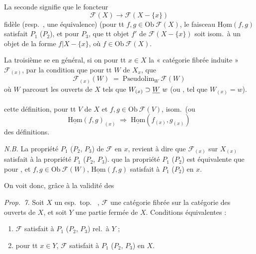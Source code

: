 \documentclass[11pt,a4paper]{article}
\begin{document}

La seconde \ill{} signifie que le foncteur
\[
  \mathcal{F}(X) \longrightarrow \mathcal{F}(X - \{x\})
\]
\ill{} fidèle \struck{\ill{}} (resp.\ , une équivalence)
\ill{}  (pour tt $f, g \in \mathrm{Ob}\ \mathcal{F}(X)$,
le faisceau $\underline{\mathrm{Hom}}(f,g)$ satisfait $P_1$ ($P_2$), et pour
$P_3$, que tt objet $f'$ de $\mathcal{F}(X - \{x\})$ soit isom.\ à un objet de
la forme $f | X - \{x\}$, où $f \in \mathrm{Ob}\ \mathcal{F}(X)$.


La troisième \ill{} se  \ill{} en général, si on
 pour tt $x \in X$ la « catégorie fibrée induite »
$\mathcal{F}_{(x)}$, par la condition que pour tt \struck{\ill{}} $W$ de
$X_{x}$, \ill{} que
\[
  \mathcal{F}_{(x)}(W) \;=\; \mathrm{Pseudolim}_{W}\ \mathcal{F}(W)
\]
où $W$ parcourt les ouverts de $X$ tels que $W_{(x)} \supset \struck{W}\ w$
(ou \ill{} , tel que $W_{(x)} = w$).
\struck{\ill{}}

\ill{} cette définition, pour tt \ill{} $V$ de $X$ et \ill{}
$f, g \in \mathrm{Ob}\ \mathcal{F}(V)$, \ill{} \struck{\ill{}} isom.\ (ou
\[
  \underline{\mathrm{Hom}}(f,g)_{(x)} \;\Longrightarrow\;
  \underline{\mathrm{Hom}}(f_{(x)}, g_{(x)})
\]
\ill{} des définitions.


\emph{N.B.} La propriété $P_1$ ($P_2$, $P_3$) de $\mathcal{F}$ en $x$,
 \ill{} revient à dire que $\mathcal{F}_{(x)}$ sur
$X_{(x)}$ satisfait à la propriété $P_1$ ($P_2$, $P_3$). \ill{} que la
propriété $P_1$ ($P_2$) est équivalente \ill{} que pour  , et $f, g \in \mathrm{Ob}\ \mathcal{F}(W)$,
$\underline{\mathrm{Hom}}(f,g)$ satisfait à $P_1$ ($P_2$) en $x$.

On voit donc, grâce à \ill{} la validité des \ill{} \struck{\ill{}}

\emph{Prop.\ 7.} Soit $X$ un esp.\ top.\  ,
$\mathcal{F}$ une catégorie fibrée \ill{} sur la catégorie des ouverts de $X$,
et soit $Y$ une partie fermée de $X$. \struck{\ill{}} Conditions
équivalentes :
\begin{enumerate}
  \item[(i)] $\mathcal{F}$ satisfait à $P_1$ ($P_2$, $P_3$) rel.\ à $Y$ ;
  \item[(ii)] pour tt $x \in Y$, $\mathcal{F}$ satisfait à $P_1$ ($P_2$,
        $P_3$) en $X$.
\end{enumerate}
\end{document}
